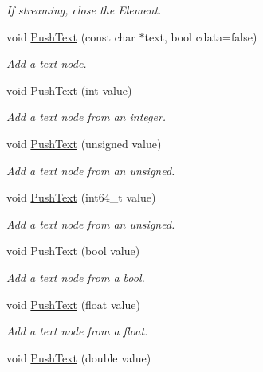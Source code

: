 \begin{DoxyCompactItemize}
\begin{DoxyCompactList}\small\item\em If streaming, close the Element. \end{DoxyCompactList}\item 
void \mbox{\hyperlink{classtinyxml2_1_1_x_m_l_printer_a1cc16a9362df4332012cb13cff6441b3}{Push\+Text}} (const char $\ast$text, bool cdata=false)
\begin{DoxyCompactList}\small\item\em Add a text node. \end{DoxyCompactList}\item 
void \mbox{\hyperlink{classtinyxml2_1_1_x_m_l_printer_a3e0d4d78de25d4cf081009e1431cea7e}{Push\+Text}} (int value)
\begin{DoxyCompactList}\small\item\em Add a text node from an integer. \end{DoxyCompactList}\item 
void \mbox{\hyperlink{classtinyxml2_1_1_x_m_l_printer_a661fb50e7e0a4918d2d259cb0fae647e}{Push\+Text}} (unsigned value)
\begin{DoxyCompactList}\small\item\em Add a text node from an unsigned. \end{DoxyCompactList}\item 
void \mbox{\hyperlink{classtinyxml2_1_1_x_m_l_printer_a96b0a0bfe105154a0a6c37d725258f0a}{Push\+Text}} (int64\+\_\+t value)
\begin{DoxyCompactList}\small\item\em Add a text node from an unsigned. \end{DoxyCompactList}\item 
void \mbox{\hyperlink{classtinyxml2_1_1_x_m_l_printer_a4390e5fa1ed05189a8686647345ab29f}{Push\+Text}} (bool value)
\begin{DoxyCompactList}\small\item\em Add a text node from a bool. \end{DoxyCompactList}\item 
void \mbox{\hyperlink{classtinyxml2_1_1_x_m_l_printer_a1dbb1390e829d0673af66b9cd1928bd7}{Push\+Text}} (float value)
\begin{DoxyCompactList}\small\item\em Add a text node from a float. \end{DoxyCompactList}\item 
void \mbox{\hyperlink{classtinyxml2_1_1_x_m_l_printer_aa715302dfc09473c77c853cbd5431965}{Push\+Text}} (double value)

\end{DoxyCompactItemize}
